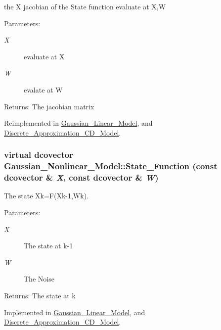 the X jacobian of the State function evaluate at X,W 

\begin{Desc}
\item[Parameters:]
\begin{description}
\item[{\em X}]evaluate at X \item[{\em W}]evalate at W\end{description}
\end{Desc}
\begin{Desc}
\item[Returns:]The jacobian matrix \end{Desc}


Reimplemented in \hyperlink{class_gaussian___linear___model_3fb2cc6feae8997ad99fce7e2b77a2ce}{Gaussian\_\-Linear\_\-Model}, and \hyperlink{class_discrete___approximation___c_d___model_b0ba3cda373913f6a1df4a417200218a}{Discrete\_\-Approximation\_\-CD\_\-Model}.\hypertarget{class_gaussian___nonlinear___model_df0e6cf50a8d5fdb6decd05046867cd8}{
\subsubsection[{State\_\-Function}]{\setlength{\rightskip}{0pt plus 5cm}virtual dcovector Gaussian\_\-Nonlinear\_\-Model::State\_\-Function (const dcovector \& {\em X}, \/  const dcovector \& {\em W})}}
\label{class_gaussian___nonlinear___model_df0e6cf50a8d5fdb6decd05046867cd8}


The state Xk=F(Xk-1,Wk). 

\begin{Desc}
\item[Parameters:]
\begin{description}
\item[{\em X}]The state at k-1 \item[{\em W}]The Noise\end{description}
\end{Desc}
\begin{Desc}
\item[Returns:]The state at k \end{Desc}


Implemented in \hyperlink{class_gaussian___linear___model_f0d24016df8709697480126c240a16ba}{Gaussian\_\-Linear\_\-Model}, and \hyperlink{class_discrete___approximation___c_d___model_83ef21b9993bfbef655874ca38777131}{Discrete\_\-Approximation\_\-CD\_\-Model}.